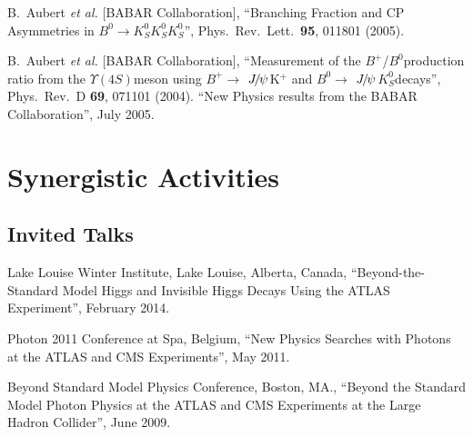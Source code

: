 \documentclass[10pt]{article}
\newcommand{\too}{$\rightarrow$}
\newcommand{\Bz}{$B^0$}
\newcommand{\Bu}{$B^+$}
\newcommand{\KS}{$K^0_{S}$}
\newcommand{\FourS}{$\Upsilon(4S)$}
\newcommand{\jpsi}{$J\mskip -3mu/\mskip -2mu\psi\mskip 2mu$}
\begin{document}
\begin{thebibliography}{99}

 {}B.~Aubert {\it et al.}  [BABAR Collaboration],
``Branching Fraction and CP Asymmetries in \Bz \too \KS \KS \KS'',
  Phys.\ Rev.\ Lett.\  {\bf 95}, 011801 (2005).

 {}B.~Aubert {\it et al.}  [BABAR Collaboration], ``Measurement of the \Bu/\Bz production ratio from the \FourS meson using \Bu $\rightarrow$ \jpsi K$^+$ and \Bz $\to$ \jpsi \KS decays'', {}Phys.\ Rev.\ D {\bf 69}, 071101 (2004).
``New Physics results from the BABAR Collaboration'', July 2005.
\section*{Synergistic Activities}
\renewcommand\refname{\vskip -1.5cm}

\subsection*{Invited Talks}
  Lake Louise Winter Institute, Lake Louise, Alberta, Canada, ``Beyond-the-Standard Model Higgs and Invisible Higgs Decays Using the ATLAS Experiment'', February 2014.

  Photon 2011 Conference at Spa, Belgium, ``New Physics Searches with Photons at the ATLAS and CMS Experiments'', May 2011.



  Beyond Standard Model Physics Conference,  Boston, MA., ``Beyond the Standard Model Photon Physics at the ATLAS and CMS Experiments at the Large Hadron Collider'', June 2009.


\end{thebibliography}
\end{document}
